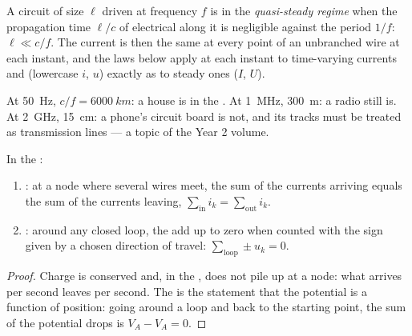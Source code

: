 \begin{definition}\label{def:b1:dc-circuits:arqs}
A circuit of size $\ell$ driven at frequency $f$ is in the
\emph{quasi-steady regime} when the propagation time $\ell/c$ of
electrical  along it is negligible against the period $1/f$:
$\ell \ll c/f$. The current is then the same at every point of an
unbranched wire at each instant, and the laws below apply at each
instant to time-varying currents and  (lowercase $i$, $u$)
exactly as to steady ones ($I$, $U$).
\end{definition}

\begin{example}\label{ex:b1:dc-circuits:arqs}
At \qty{50}{Hz}, $c/f = \qty{6000}{km}$: a house is in the . At \qty{1}{MHz}, \qty{300}{m}: a radio still is. At \qty{2}{GHz},
\qty{15}{cm}: a phone's circuit board is not, and its tracks must be
treated as transmission lines --- a topic of the Year 2 volume.
\end{example}

\begin{theorem}\label{thm:b1:dc-circuits:kirchhoff}
In the :
\begin{enumerate}
  \item \emph{}: at a node where several wires meet, the sum of
        the currents arriving equals the sum of the currents leaving,
        $\sum_{\text{in}} i_k = \sum_{\text{out}} i_k$.
  \item \emph{}: around any closed loop, the  add up to
        zero when counted with the sign given by a chosen direction of
        travel: $\sum_{\text{loop}} \pm u_k = 0$.
\end{enumerate}
\end{theorem}

\begin{proof}
Charge is conserved and, in the , does not pile up
at a node: what arrives per second leaves per second. The  is
the statement that the potential is a function of position: going
around a loop and back to the starting point, the sum of the potential
drops is $V_A - V_A = 0$.
\end{proof}

